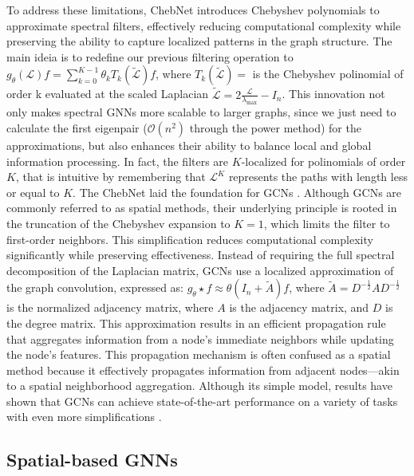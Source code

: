 To address these limitations, ChebNet introduces Chebyshev polynomials to approximate spectral filters, effectively reducing computational complexity while preserving the ability to capture localized patterns in the graph structure. The main ideia is to redefine our previous filtering operation to $ g_{\theta}(\mathcal{L} ) f = \sum_{k=0}^{K-1} \theta_k T_k(\widetilde{\mathcal{L}}) f $, where $T_k(\widetilde{\mathcal{L}}) = $ is the Chebyshev polinomial of order k evaluated at the scaled Laplacian $\widetilde{\mathcal{L}} = 2 \frac{\mathcal{L}}{\lambda_\text{max}} - I_n$. This innovation not only makes spectral GNNs more scalable to larger graphs, since we just need to calculate the first eigenpair ($\mathcal{O}(n^2)$ through the power method) for the approximations, but also enhances their ability to balance local and global information processing. In fact, the filters are $K$-localized for polinomials of order $K$, that is intuitive by remembering that $\mathcal{L} ^K$ represents the paths with length less or equal to $K$.  
The ChebNet laid the foundation for GCNs \cite{kipf2016semi}. Although GCNs are commonly referred to as spatial methods, their underlying principle is rooted in the truncation of the Chebyshev expansion to $K=1$, which limits the filter to first-order neighbors. This simplification reduces computational complexity significantly while preserving effectiveness. Instead of requiring the full spectral decomposition of the Laplacian matrix, GCNs use a localized approximation of the graph convolution, expressed as: $g_{\theta} \star f \approx \theta (I_n + \widetilde{A}) f$, where $\widetilde{A} = D^{-\frac{1}{2}} A D^{-\frac{1}{2}}$ is the normalized adjacency matrix, where $A$ is the adjacency matrix, and $D$ is the degree matrix. This approximation results in an efficient propagation rule that aggregates information from a node's immediate neighbors while updating the node's features. This propagation mechanism is often confused as a spatial method because it effectively propagates information from adjacent nodes—akin to a spatial neighborhood aggregation. Although its simple model, results have shown that GCNs can achieve state-of-the-art performance on a variety of tasks with even more simplifications \cite{wu2019simplifying}.

\subsection{Spatial-based GNNs}